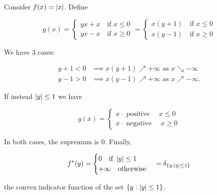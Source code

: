 \begin{example}
    
    Consider $f(x) = \left|x\right|$. Define

    \[ g(x) = \begin{cases}
        yx + x \quad \text{if } x \le 0 \\
        yx - x \quad \text{if } x \ge 0  
    \end{cases} = 
    \begin{cases}
        x(y+1) \quad \text{if } x \le 0 \\
        x(y-1) \quad \text{if } x \ge 0 
    \end{cases} \]

    We have 3 cases:

    \begin{align*}
        y+1 < 0 &\implies x(y+1) \nearrow +\infty \text{ as } x\searrow -\infty \\
        y-1 > 0 &\implies x(y-1) \nearrow +\infty \text{ as } x\nearrow -\infty.
    \end{align*}

    If instead $\left|y\right| \le 1$ we have 

    \[ g(x) = \begin{cases}
        x\cdot\text{ positive } \quad x \le 0 \\
        x\cdot\text{ negative } \quad x \ge 0
    \end{cases} \]

    In both cases, the supremum is 0. Finally,

    \[ f^*(y) = \begin{cases}
        0 \quad \text{if } \left|y\right| \le 1 \\
        +\infty \quad \text{otherwise}
    \end{cases} = \delta_{\left\{ y : \left|y\right| \le 1 \right\}} \]

    the convex indicator function of the set $\left\{ y : \left|{y}\right| \le 1  \right\}$.

\end{example}




